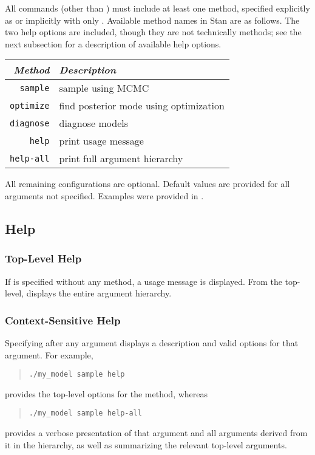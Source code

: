 All commands (other than ) must include at least one
method, specified explicitly as  or
implicitly with only .  Available method names in
Stan are as follows.  The two help options are included, though they
are not technically methods;  see the next subsection for a
description of available help options.
%
\begin{center}
\begin{tabular}{r|l}
{\it Method} & {\it Description} \\ \hline
{\tt sample}   &  sample using MCMC
\\
{\tt optimize} &  find posterior mode using optimization
\\
{\tt diagnose} &  diagnose models
\\ \hline
{\tt help}     & print usage message
\\
{\tt help-all} & print full argument hierarchy
\end{tabular}
\end{center}
%
All remaining configurations are optional.  Default values are
provided for all arguments not specified.  Examples were provided in
. 


\subsection{Help}

\subsubsection{Top-Level Help}

If  is specified without any method, a usage message is
displayed.  From the top-level,  displays the entire
argument hierarchy.

\subsubsection{Context-Sensitive Help}

Specifying  after any argument displays a description and
valid options for that argument.  For example,
\begin{quote}
\begin{Verbatim}[fontshape=sl]
./my_model sample help
\end{Verbatim}
\end{quote}
%
provides the top-level options for the  method, whereas
%
\begin{quote}
\begin{Verbatim}[fontshape=sl]
./my_model sample help-all
\end{Verbatim}
\end{quote}
%
provides a verbose presentation of that argument and all arguments
derived from it in the hierarchy, as well as summarizing the relevant
top-level arguments.

